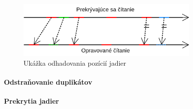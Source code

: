 \begin{figure}
    \centering
    \includegraphics[width=0.8\textwidth]{images/odhadovanie_pozicie.png}
    \caption{Ukážka odhadovania pozícií jadier}
    \label{fig:odhadovanie_pozicie}
\end{figure} 

\paragraph{Odstraňovanie duplikátov}



\paragraph{Prekrytia jadier}